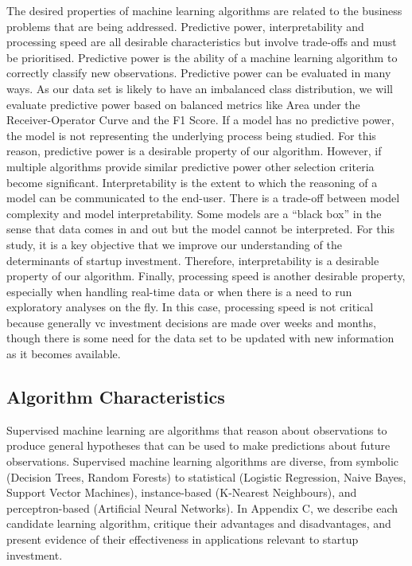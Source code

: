 \documentclass[../thesis/thesis.tex]{subfiles}
\begin{document}
The desired properties of machine learning algorithms are related to the business problems that are being addressed. Predictive power, interpretability and processing speed are all desirable characteristics but involve trade-offs and must be prioritised. Predictive power is the ability of a machine learning algorithm to correctly classify new observations. Predictive power can be evaluated in many ways. As our data set is likely to have an imbalanced class distribution, we will evaluate predictive power based on balanced metrics like Area under the Receiver-Operator Curve and the F1 Score. If a model has no predictive power, the model is not representing the underlying process being studied. For this reason, predictive power is a desirable property of our algorithm. However, if multiple algorithms provide similar predictive power other selection criteria become significant. Interpretability is the extent to which the reasoning of a model can be communicated to the end-user. There is a trade-off between model complexity and model interpretability. Some models are a ``black box'' in the sense that data comes in and out but the model cannot be interpreted. For this study, it is a key objective that we improve our understanding of the determinants of startup investment. Therefore, interpretability is a desirable property of our algorithm. Finally, processing speed is another desirable property, especially when handling real-time data or when there is a need to run exploratory analyses on the fly. In this case, processing speed is not critical because generally \gls{vc} investment decisions are made over weeks and months, though there is some need for the data set to be updated with new information as it becomes available.

\subsection{Algorithm Characteristics}

Supervised machine learning are algorithms that reason about observations to produce general hypotheses that can be used to make predictions about future observations. Supervised machine learning algorithms are diverse, from symbolic (Decision Trees, Random Forests) to statistical (Logistic Regression, Naive Bayes, Support Vector Machines), instance-based (K-Nearest Neighbours), and perceptron-based (Artificial Neural Networks). In Appendix C, we describe each candidate learning algorithm, critique their advantages and disadvantages, and present evidence of their effectiveness in applications relevant to startup investment.
\end{document}
